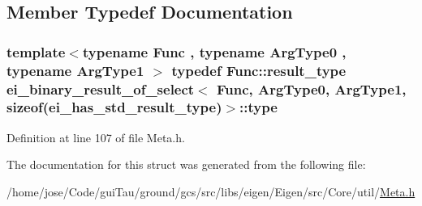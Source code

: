 \subsection{Member Typedef Documentation}
\hypertarget{structei__binary__result__of__select_3_01_func_00_01_arg_type0_00_01_arg_type1_00_01sizeof_07ei__has__std__result__type_08_4_a8db90284ccced2b19045cf284ee2299d}{
\subsubsection[{type}]{\setlength{\rightskip}{0pt plus 5cm}template$<$typename Func , typename Arg\-Type0 , typename Arg\-Type1 $>$ typedef Func\-::result\-\_\-type {\bf ei\-\_\-binary\-\_\-result\-\_\-of\-\_\-select}$<$ Func, Arg\-Type0, Arg\-Type1, sizeof({\bf ei\-\_\-has\-\_\-std\-\_\-result\-\_\-type})$>$\-::{\bf type}}}\label{structei__binary__result__of__select_3_01_func_00_01_arg_type0_00_01_arg_type1_00_01sizeof_07ei__has__std__result__type_08_4_a8db90284ccced2b19045cf284ee2299d}


Definition at line 107 of file Meta.\-h.



The documentation for this struct was generated from the following file\-:\begin{DoxyCompactItemize}
\item 
/home/jose/\-Code/gui\-Tau/ground/gcs/src/libs/eigen/\-Eigen/src/\-Core/util/\hyperlink{_meta_8h}{Meta.\-h}\end{DoxyCompactItemize}
